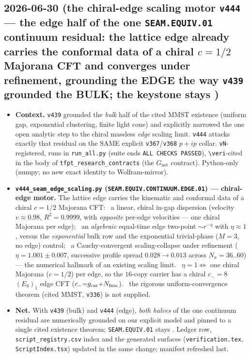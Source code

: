 \subsection*{2026-06-30 (the chiral-edge scaling motor \texttt{v444} --- the edge half of the one \texttt{SEAM.EQUIV.01} continuum residual: the lattice edge already carries the conformal data of a chiral $c{=}1/2$ Majorana CFT and converges under refinement, grounding the EDGE the way \texttt{v439} grounded the BULK; the keystone stays \mO)}
\begin{itemize}
\item \textbf{Context.} \texttt{v439} grounded the \emph{bulk} half of the cited MMST existence (uniform gap,
exponential clustering, finite light cone) and explicitly narrowed the one open analytic step to the chiral massless
\emph{edge} scaling limit. \texttt{v444} attacks exactly that residual on the SAME explicit \texttt{v367}/\texttt{v368}
$p{+}ip$ collar. \texttt{vN}-registered, runs in \texttt{run\_all.py} (suite ends \texttt{ALL CHECKS PASSED}),
\texttt{\textbackslash veri}-cited in the body of \texttt{tfpt\_research\_contracts} (the $G_{\mathrm{net}}$ contract).
Python-only (numpy; no new exact identity to Wolfram-mirror).
\item \textbf{\texttt{v444\_seam\_edge\_scaling.py} (\texttt{SEAM.EQUIV.CONTINUUM.EDGE.01}) --- chiral-edge motor.}
The lattice edge carries the kinematic and conformal data of a chiral $c{=}1/2$ Majorana CFT: \mE\ a linear, chiral
in-gap dispersion (velocity $v{\approx}0.98$, $R^2{=}0.9999$, with \emph{opposite} per-edge velocities --- one chiral
Majorana per edge); \mE\ an \emph{algebraic} equal-time edge two-point $\sim r^{-\eta}$ with $\eta{\approx}1$, versus
the \emph{exponential} bulk row and the exponential trivial-phase ($M{=}3$, no edge) control; \mE\ a Cauchy-convergent
scaling-collapse under refinement ($\eta{=}1.001{\pm}0.007$, successive profile spread $0.028{\to}0.013$ across
$N_x{=}36..60$) --- the numerical hallmark of an existing scaling limit. \mC\ $\eta{=}1\Leftrightarrow$ one chiral
Majorana ($c{=}1/2$) per edge, so the $16$-copy carrier has a chiral $c_-{=}8$ $(E_8)_1$ edge CFT
($c_-{=}g_{\mathrm{car}}{+}N_{\mathrm{fam}}$). \mO\ the rigorous uniform-convergence theorem (cited MMST, \texttt{v336}) is not supplied.
\item \textbf{Net.} With \texttt{v439} (bulk) and \texttt{v444} (edge), \emph{both halves} of the one continuum
residual are numerically grounded on our explicit model and pinned to a single cited existence theorem;
\texttt{SEAM.EQUIV.01} stays \mO. Ledger row, \texttt{script\_registry.csv} index and the generated surfaces
(\texttt{verification.tex}, \texttt{ScriptIndex.tsx}) updated in the same change; manifest refreshed last.
\end{itemize}

